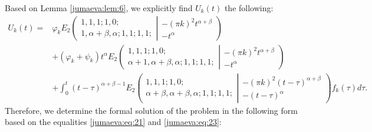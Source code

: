 \documentclass{amsart}
\numberwithin{equation}{section}
\begin{document}
Based on Lemma \ref{jumaeva:lem:6}, we explicitly find $U_k(t)$ the following:
\begin{align}
U_k(t)=&\varphi_k E_2\left( 
\begin{array}{c}
1, 1, 1; 1, 0; \\
1, \alpha+\beta, \alpha ; 1, 1; 1, 1; 
\end{array}
\left| 
\begin{array}{c}
-(\pi k)^2 t^{\alpha+\beta} \\
-t^\alpha 
\end{array}\right.\right) \nonumber\\
&+(\varphi_k+\psi_k)t^\alpha E_2\left( 
\begin{array}{c}
1, 1, 1; 1, 0; \\
\alpha+1, \alpha+\beta, \alpha ; 1, 1; 1, 1; 
\end{array}
\left| 
\begin{array}{c}
-(\pi k)^2 t^{\alpha+\beta} \\
-t^\alpha 
\end{array}\right.\right) \nonumber \\
& +\int_0^t (t-\tau)^{\alpha+\beta-1} E_2\left( 
\begin{array}{c}
1, 1, 1; 1, 0; \\
\alpha+\beta, \alpha+\beta, \alpha ; 1, 1; 1, 1; 
\end{array}
\left| 
\begin{array}{c}
-(\pi k)^2 (t-\tau)^{\alpha+\beta} \\
-(t-\tau)^\alpha 
\end{array}
\right.
\right) f_k(\tau) d\tau.\label{jumaeva:eq:23}
\end{align}
Therefore, we determine the formal solution of the problem in the following form based on the equalities \eqref{jumaeva:eq:21} and \eqref{jumaeva:eq:23}:
\end{document}
